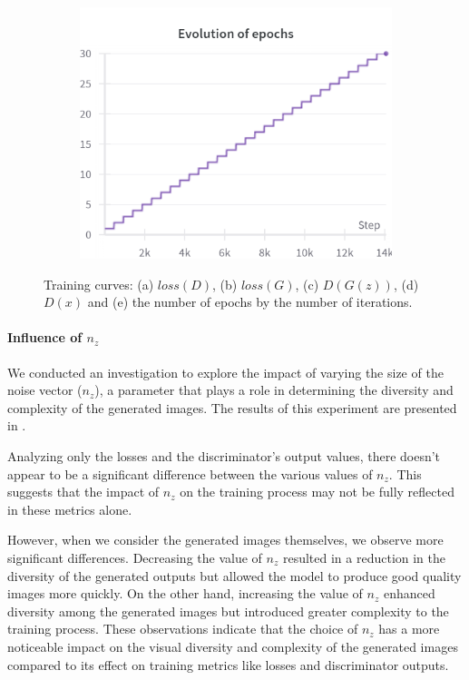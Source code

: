 \begin{figure}[H]
    \begin{subfigure}{0.45\textwidth}
        \centering
        \includegraphics[width=0.95\linewidth]{longer_epochs/epochs.png}
        \caption{}
        \label{subfig:longer_epochs/epochs}
    \end{subfigure}%

    \caption{Training curves: (a) $loss(D)$, (b) $loss(G)$, (c) $D(G(z))$, (d) $D(x)$ and (e) the number of epochs by the number of iterations.}
    \label{fig:longer_epochs_losses}
\end{figure}



\paragraph*{Influence of $n_z$}
We conducted an investigation to explore the impact of varying the size of the noise vector ($n_z$), a parameter that plays a role in determining the diversity and complexity of the generated images. The results of this experiment are presented in .

Analyzing only the losses and the discriminator's output values, there doesn't appear to be a significant difference between the various values of $n_z$. This suggests that the impact of $n_z$ on the training process may not be fully reflected in these metrics alone.

However, when we consider the generated images themselves, we observe more significant differences. Decreasing the value of $n_z$ resulted in a reduction in the diversity of the generated outputs but allowed the model to produce good quality images more quickly. On the other hand, increasing the value of $n_z$ enhanced diversity among the generated images but introduced greater complexity to the training process. These observations indicate that the choice of $n_z$ has a more noticeable impact on the visual diversity and complexity of the generated images compared to its effect on training metrics like losses and discriminator outputs.

